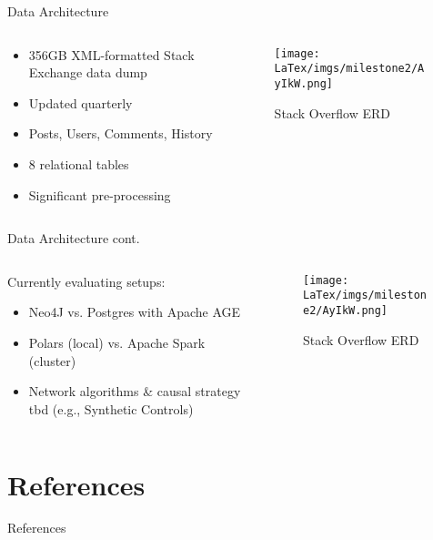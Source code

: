 \documentclass{beamer}
\begin{document}
    \begin{frame}{Data Architecture}
        \begin{columns}[c]
            \begin{column}{0.4\textwidth}
                \centering
                    \begin{itemize}
                        \item 356GB XML-formatted Stack Exchange data dump
                        \item Updated quarterly
                        \item Posts, Users, Comments, History
                        \item 8 relational tables
                        \item Significant pre-processing
                    \end{itemize}
            \end{column}
            \begin{column}{0.55\textwidth}
                \begin{figure}[H]
                    \centering
                    \texttt{[image: LaTex/imgs/milestone2/AyIkW.png]}
                    \caption{Stack Overflow ERD \parencite{stackexchange_answer_2019}}
                    \label{fig:erd}
                \end{figure}
            \end{column}
        \end{columns}  
    \end{frame}

    \begin{frame}{Data Architecture cont.}
        \begin{columns}[c]
            \begin{column}{0.475\textwidth}
                Currently evaluating setups:
                \centering
                    \begin{itemize}
                        \item Neo4J vs. Postgres with Apache AGE
                        \item Polars (local) vs. Apache Spark (cluster)
                        \item Network algorithms \& causal strategy tbd (e.g., Synthetic Controls)
                    \end{itemize}
            \end{column}
            \begin{column}{0.475\textwidth}
                \begin{figure}[H]
                    \centering
                    \texttt{[image: LaTex/imgs/milestone2/AyIkW.png]}
                    \caption{Stack Overflow ERD \parencite{stackexchange_answer_2019}}
                    \label{fig:erd}
                \end{figure}
            \end{column}
        \end{columns}  
    \end{frame}    
  
    \section{References}
    
    \begin{frame}[allowframebreaks]{References}
        \printbibliography[heading=none]
    \end{frame}
    
\end{document}
